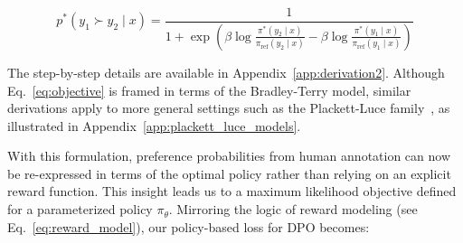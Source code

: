 \begin{equation}\label{eq:objective}
    p^*(y_1\succ y_2 \mid x)=\frac{1}{1 + \exp\left(\beta \log \frac{\pi^*(y_2\mid x)}{\pi_\text{ref}(y_2\mid x)} - \beta \log \frac{\pi^*(y_1\mid x)}{\pi_\text{ref}(y_1\mid x)}\right)}
\end{equation}

The step-by-step details are available in Appendix~\ref{app:derivation2}. Although Eq.~\ref{eq:objective} is framed in terms of the Bradley-Terry model, similar derivations apply to more general settings such as the Plackett-Luce family~\citep{plackett1975analysis, luce2012individual}, as illustrated in Appendix~\ref{app:plackett_luce_models}.

With this formulation, preference probabilities from human annotation can now be re-expressed in terms of the optimal policy rather than relying on an explicit reward function. This insight leads us to a maximum likelihood objective defined for a parameterized policy $\pi_\theta$. Mirroring the logic of reward modeling (see Eq.~\ref{eq:reward_model}), our policy-based loss for DPO becomes:

